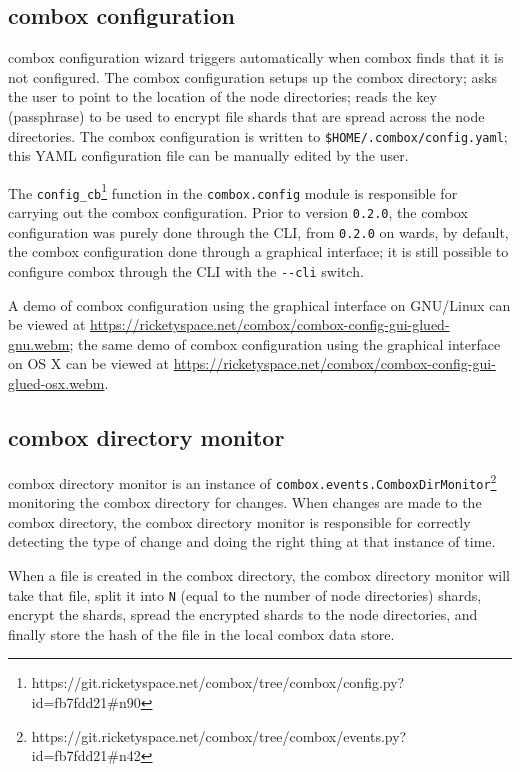 \subsection{combox configuration}\label{sec:3-combox-config}

combox configuration wizard triggers automatically when combox finds
that it is not configured. The combox configuration setups up the
combox directory; asks the user to point to the location of the node
directories; reads the key (passphrase) to be used to encrypt file
shards that are spread across the node directories. The combox
configuration is written to
\verb+$HOME/.combox/config.yaml+; this YAML configuration file can be
manually edited by the user.

The
\verb+config_cb+\footnote{https://git.ricketyspace.net/combox/tree/combox/config.py?id=fb7fdd21\#n90}
function in the \verb+combox.config+ module is responsible for
carrying out the combox configuration. Prior to version \verb+0.2.0+,
the combox configuration was purely done through the CLI, from
\verb+0.2.0+ on wards, by default, the combox configuration done
through a graphical interface; it is still possible to configure
combox through the CLI with the \verb+--cli+ switch.

A demo of combox configuration using the graphical interface on
GNU/Linux can be viewed at
\url{https://ricketyspace.net/combox/combox-config-gui-glued-gnu.webm};
the same demo of combox configuration using the graphical interface on
OS X can be viewed at
\url{https://ricketyspace.net/combox/combox-config-gui-glued-osx.webm}.

\subsection{combox directory monitor}\label{sec:3-combox-cdirm}

combox directory monitor is an instance of
\verb+combox.events.ComboxDirMonitor+\footnote{https://git.ricketyspace.net/combox/tree/combox/events.py?id=fb7fdd21\#n42}
monitoring the combox directory for changes. When changes are made to
the combox directory, the combox directory monitor is responsible for
correctly detecting the type of change and doing the right thing at
that instance of time.

When a file is created in the combox directory, the combox directory
monitor will take that file, split it into \verb+N+ (equal to the
number of node directories) shards, encrypt the shards, spread the
encrypted shards to the node directories, and finally store the hash
of the file in the local combox data store.

